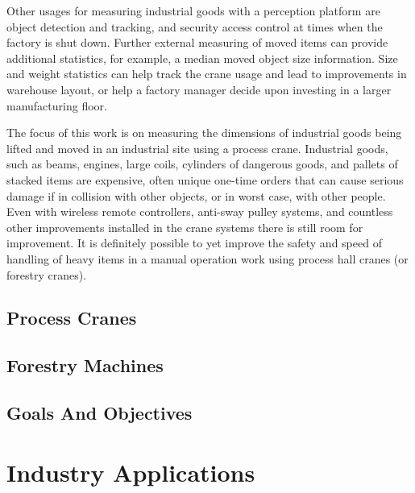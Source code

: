 \documentclass[12pt,a4paper,oneside,pdftex]{report}
\begin{document}
Other usages for measuring industrial goods with a perception platform are object detection and tracking, and security access control at times when the factory is shut down. Further external measuring of moved items can provide additional statistics, for example, a median moved object size information. Size and weight statistics can help track the crane usage and lead to improvements in warehouse layout, or help a factory manager decide upon investing in a larger manufacturing floor.

The focus of this work is on measuring the dimensions of industrial goods being lifted and moved in an industrial site using a process crane. Industrial goods, such as beams, engines, large coils, cylinders of dangerous goods, and pallets of stacked items are expensive, often unique one-time orders that can cause serious damage if in collision with other objects, or in worst case, with other people. Even with wireless remote controllers, anti-sway pulley systems, and countless other improvements installed in the crane systems there is still room for improvement. It is definitely possible to yet improve the safety and speed of handling of heavy items in a manual operation work using process hall cranes (or forestry cranes).

\section{Process Cranes}
\label{section:process_cranes}



\section{Forestry Machines}
\label{section:forestry_machines}
\section{Goals And Objectives}
\label{section:goals_and_objectives}

\chapter{Industry Applications}
\label{chapter:industry_applications}


\end{document}
